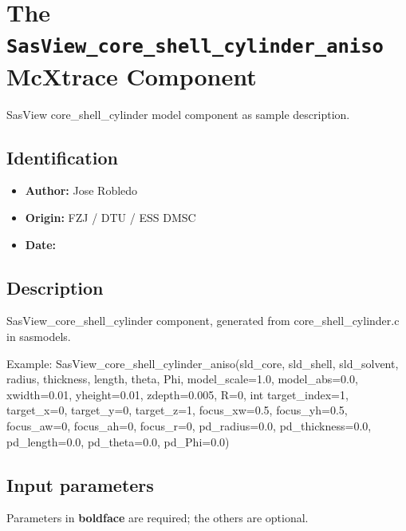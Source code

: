 \section{The \texttt{SasView\_core\_shell\_cylinder\_aniso} McXtrace Component}
SasView core\_shell\_cylinder model component as sample description.

\subsection*{Identification}
\begin{itemize}
  \item \textbf{Author:} Jose Robledo
  \item \textbf{Origin:} FZJ / DTU / ESS DMSC
  \item \textbf{Date:} 
\end{itemize}

\subsection*{Description}
SasView\_core\_shell\_cylinder component, generated from core\_shell\_cylinder.c in sasmodels.

Example: SasView\_core\_shell\_cylinder\_aniso(sld\_core, sld\_shell, sld\_solvent, radius, thickness, length, theta, Phi, model\_scale=1.0, model\_abs=0.0, xwidth=0.01, yheight=0.01, zdepth=0.005, R=0, int target\_index=1, target\_x=0, target\_y=0, target\_z=1, focus\_xw=0.5, focus\_yh=0.5, focus\_aw=0, focus\_ah=0, focus\_r=0, pd\_radius=0.0, pd\_thickness=0.0, pd\_length=0.0, pd\_theta=0.0, pd\_Phi=0.0)

\subsection*{Input parameters}
Parameters in \textbf{boldface} are required; the others are optional.

